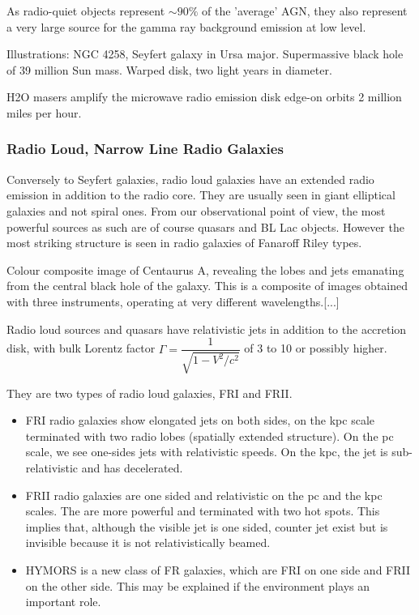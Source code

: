 \documentclass[10pt,a4paper,english,draft]{article}
\begin{document}
As radio-quiet objects represent $\sim 90 \% $ of the 'average' AGN, they also
represent a very large source for the gamma ray background emission at low
level.

Illustrations: NGC 4258, Seyfert galaxy in Ursa major. Supermassive black hole
of 39 million Sun mass. Warped disk, two light years in diameter.

H2O masers amplify the microwave radio emission disk edge-on orbits 2 million
miles per hour.

\subsubsection{Radio Loud, Narrow Line Radio Galaxies}

Conversely to Seyfert galaxies, radio loud galaxies have an extended radio
emission in addition to the radio core. They are usually seen in giant
elliptical galaxies and not spiral ones. From our observational point of view,
the most powerful sources as such are of course quasars and BL Lac objects.
However the most striking structure is seen in radio galaxies of Fanaroff Riley
types.

Colour composite image of Centaurus A, revealing the lobes and jets emanating
from the central black hole of the galaxy. This is a composite of images
obtained with three instruments, operating at very different wavelengths.[...]

Radio loud sources and quasars have relativistic jets in addition to the
accretion disk, with bulk Lorentz factor $\Gamma=\dfrac{1}{\sqrt{1-V^2/c^2}}$
of 3 to 10 or possibly higher.

They are two types of radio loud galaxies, FRI and FRII.
\begin{itemize}
    \item FRI radio galaxies show elongated jets on both sides, on the kpc
          scale terminated with two radio lobes (spatially extended structure).
          On the pc scale, we see one-sides jets with relativistic speeds. On
          the kpc, the jet is sub-relativistic and has decelerated.
    \item FRII radio galaxies are one sided and relativistic on the pc and the
          kpc scales. The are more powerful and terminated with two hot spots.
          This implies that, although the visible jet is one sided, counter jet
          exist but is invisible because it is not relativistically beamed.
    \item HYMORS is a new class of FR galaxies, which are FRI on one side and
          FRII on the other side. This may be explained if the environment
          plays an important role.
\end{itemize}
\end{document}
